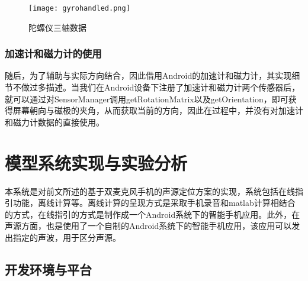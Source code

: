 \documentclass[winfonts,oneside]{njuthesis}
\begin{document}
			\begin{figure}[H]
				\centering
				\texttt{[image: gyrohandled.png]} 
				\caption{{陀螺仪三轴数据}}
				\label{fig: gyro}
			\end{figure}
		
		\subsection{加速计和磁力计的使用}	
			
			随后，为了辅助与实际方向结合，因此借用Android的加速计和磁力计，其实现细节不做过多描述。当我们在Android设备下注册了加速计和磁力计两个传感器后，就可以通过对SensorManager调用getRotationMatrix以及getOrientation，即可获得屏幕朝向与磁极的夹角，从而获取当前的方向，因此在过程中，并没有对加速计和磁力计数据的直接使用。
			
	
\chapter{模型系统实现与实验分析}
	
	本系统是对前文所述的基于双麦克风手机的声源定位方案的实现，系统包括在线指引功能，离线计算等。离线计算的呈现方式是采取手机录音和matlab计算相结合的方式，在线指引的方式是制作成一个Android系统下的智能手机应用。此外，在声源方面，也是使用了一个自制的Android系统下的智能手机应用，该应用可以发出指定的声波，用于区分声源。
	
	
	\section{开发环境与平台}
		
\end{document}

